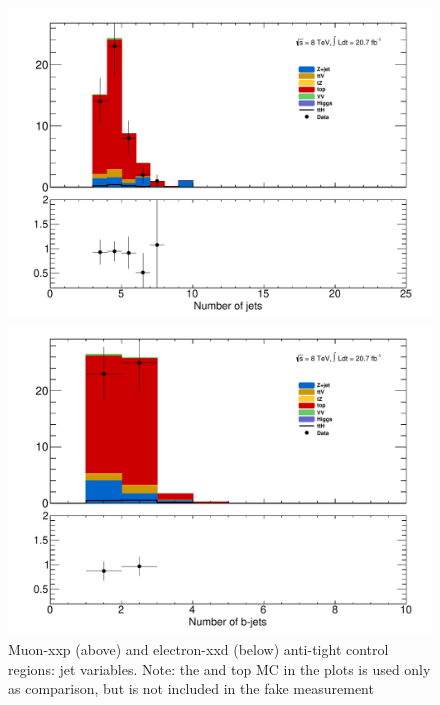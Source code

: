 \begin{figure}[!htbp]
\begin{minipage}[h]{0.5\textwidth}
    \centering \includegraphics[width=\textwidth]{figs/fake/cr_d1_NJet}
  \end{minipage}\hfill
  \begin{minipage}[h]{0.5\textwidth}
    \centering \includegraphics[width=\textwidth]{figs/fake/cr_d1_NJetBTag}
  \end{minipage}\hfill

  
  \caption{Muon-xxp (above) and electron-xxd (below) anti-tight control regions: jet variables. Note: the \ttbar and top MC in the plots is used only as comparison, but is not included
  in the fake measurement}
  \label{figure:background_3lcr}
  \end{figure} 

